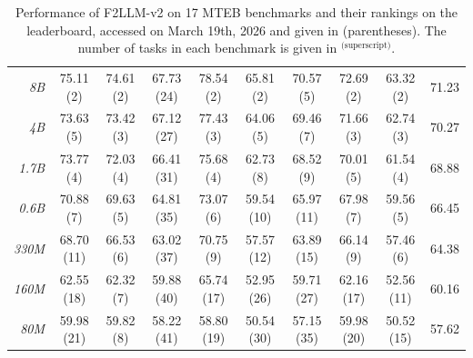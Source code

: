 \begin{table}[th]
{\begin{tabular}{rccccccccc}
    \emph{8B} & 75.11 (2) & 74.61 (2) & 67.73 (24) & 78.54 (2) & 65.81 (2) & 70.57 (5) & 72.69 (2) & 63.32 (2) & 71.23 \\
    \emph{4B} & 73.63 (5) & 73.42 (3) & 67.12 (27) & 77.43 (3) & 64.06 (5) & 69.46 (7) & 71.66 (3) & 62.74 (3) & 70.27 \\
    \emph{1.7B} & 73.77 (4) & 72.03 (4) & 66.41 (31) & 75.68 (4) & 62.73 (8) & 68.52 (9) & 70.01 (5) & 61.54 (4) & 68.88 \\
    \emph{0.6B} & 70.88 (7) & 69.63 (5) & 64.81 (35) & 73.07 (6) & 59.54 (10) & 65.97 (11) & 67.98 (7) & 59.56 (5) & 66.45 \\
    \emph{330M} & 68.70 (11) & 66.53 (6) & 63.02 (37) & 70.75 (9) & 57.57 (12) & 63.89 (15) & 66.14 (9) & 57.46 (6) & 64.38 \\
    \emph{160M} & 62.55 (18) & 62.32 (7) & 59.88 (40) & 65.74 (17) & 52.95 (26) & 59.71 (27) & 62.16 (17) & 52.56 (11) & 60.16 \\
    \emph{80M} & 59.98 (21) & 59.82 (8) & 58.22 (41) & 58.80 (19) & 50.54 (30) & 57.15 (35) & 59.98 (20) & 50.52 (15) & 57.62 \\
    \bottomrule
    \end{tabular}
    }
    \caption{Performance of F2LLM-v2 on 17 MTEB benchmarks and their rankings on the leaderboard, accessed on March 19th, 2026 and given in (parentheses). The number of tasks in each benchmark is given in $^{\text{(superscript)}}$.}
    \label{tab:main-results}
\end{table}